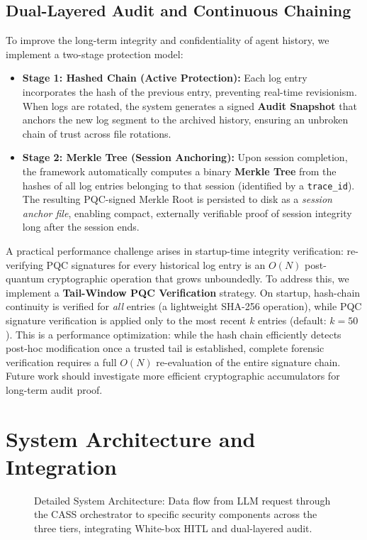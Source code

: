 \documentclass[conference]{IEEEtran}
\begin{document}
\subsection{Dual-Layered Audit and Continuous Chaining}
To improve the long-term integrity and confidentiality of agent history, we implement a two-stage protection model:
\begin{itemize}
    \item \textbf{Stage 1: Hashed Chain (Active Protection):} Each log entry incorporates the hash of the previous entry, preventing real-time revisionism. When logs are rotated, the system generates a signed \textbf{Audit Snapshot} that anchors the new log segment to the archived history, ensuring an unbroken chain of trust across file rotations.
    \item \textbf{Stage 2: Merkle Tree (Session Anchoring):} Upon session completion, the framework automatically computes a binary \textbf{Merkle Tree} from the hashes of all log entries belonging to that session (identified by a \texttt{trace\_id}). The resulting PQC-signed Merkle Root is persisted to disk as a \textit{session anchor file}, enabling compact, externally verifiable proof of session integrity long after the session ends.
\end{itemize}

A practical performance challenge arises in startup-time integrity verification: re-verifying PQC signatures for every historical log entry is an $O(N)$ post-quantum cryptographic operation that grows unboundedly. To address this, we implement a \textbf{Tail-Window PQC Verification} strategy. On startup, hash-chain continuity is verified for \textit{all} entries (a lightweight SHA-256 operation), while PQC signature verification is applied only to the most recent $k$ entries (default: $k=50$). This is a performance optimization: while the hash chain efficiently detects post-hoc modification once a trusted tail is established, complete forensic verification requires a full $O(N)$ re-evaluation of the entire signature chain. Future work should investigate more efficient cryptographic accumulators for long-term audit proof.

\section{System Architecture and Integration}
\label{sec:arch}

\begin{figure}[t]
\centering
\resizebox{0.95\textwidth}{!}{
    
}
\caption{Detailed System Architecture: Data flow from LLM request through the CASS orchestrator to specific security components across the three tiers, integrating White-box HITL and dual-layered audit.}
\label{fig:detailed_arch}
\end{figure}
\end{document}
